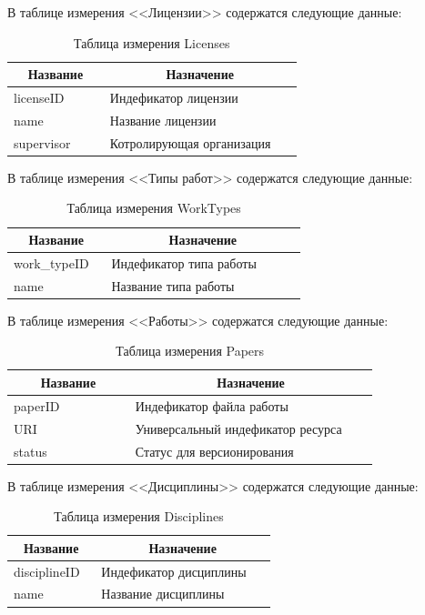 \documentclass[a4paper,14pt]{extarticle}
\newcommand{\heading}[1]{\multicolumn{1}{|c|}{\textbf{#1}}}
\begin{document}
\newpage
В таблице измерения <<Лицензии>> содержатся следующие данные:
\begin{table}[h!]
	\caption{Таблица измерения Licenses}
	\begin{tabular}{|p{0.3\linewidth}|p{0.6\linewidth}|}
		\hline
		\heading{Название} & \heading{Назначение} \\ \hline
		licenseID & Индефикатор лицензии \\ \hline
		name & Название лицензии \\ \hline
		supervisor & Котролирующая организация \\ \hline
	\end{tabular}
	\label{tab:licenses}
\end{table}

В таблице измерения <<Типы работ>> содержатся следующие данные:
\begin{table}[h!]
\caption{Таблица измерения WorkTypes}
\begin{tabular}{|p{0.3\linewidth}|p{0.6\linewidth}|}
	\hline
	\heading{Название} & \heading{Назначение} \\ \hline
		work\_typeID & Индефикатор типа работы \\ \hline
		name & Название типа работы \\ \hline
	\end{tabular}
	\label{tab:worktypes}
\end{table}


В таблице измерения <<Работы>> содержатся следующие данные:
\begin{table}[h!]
	\caption{Таблица измерения Papers}
	\begin{tabular}{|p{0.3\linewidth}|p{0.6\linewidth}|}
		\hline
		\heading{Название} & \heading{Назначение} \\ \hline
		paperID & Индефикатор файла работы \\ \hline
		URI & Универсальный индефикатор ресурса \\ \hline
		status & Статус для версионирования \\ \hline
	\end{tabular}
	\label{tab:papers}
\end{table}

В таблице измерения <<Дисциплины>> содержатся следующие данные:
\begin{table}[h!]
	\caption{Таблица измерения Disciplines}
	\begin{tabular}{|p{0.3\linewidth}|p{0.6\linewidth}|}
		\hline
		\heading{Название} & \heading{Назначение} \\ \hline
		disciplineID & Индефикатор дисциплины  \\ \hline
		name & Название дисциплины \\ \hline
	\end{tabular}
	\label{tab:disciplines}
\end{table}
\end{document}
